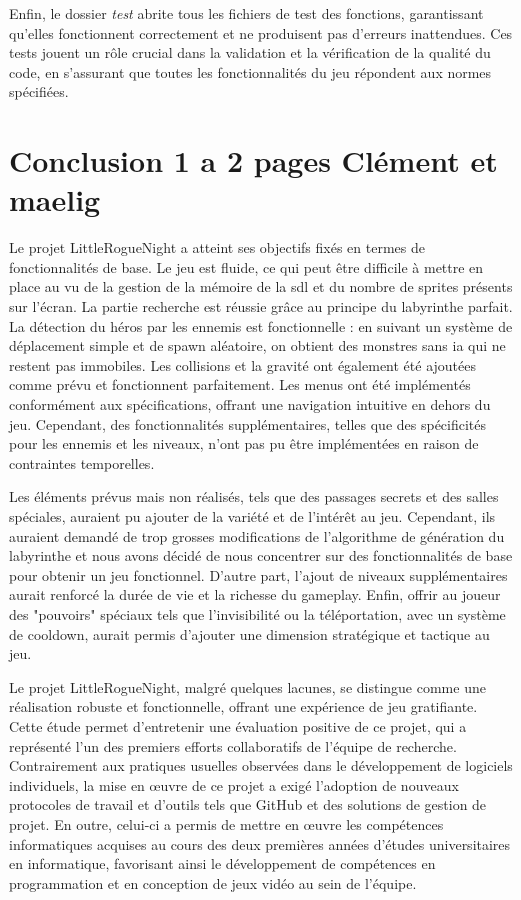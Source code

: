 \documentclass[10pt]{article}
\begin{document}
Enfin, le dossier \textit{test} abrite tous les fichiers de test des fonctions, garantissant qu'elles fonctionnent correctement et ne produisent pas d'erreurs inattendues. Ces tests jouent un rôle crucial dans la validation et la vérification de la qualité du code, en s'assurant que toutes les fonctionnalités du jeu répondent aux normes spécifiées.

   
\section{Conclusion 1 a 2 pages Clément et maelig}

Le projet LittleRogueNight a atteint ses objectifs fixés en termes de fonctionnalités de base. Le jeu est fluide, ce qui peut être difficile à mettre en place au vu de la gestion de la mémoire de la \gls{sdl} et du nombre de \gls{sprites} présents sur l'écran. La partie recherche est réussie grâce au principe du labyrinthe parfait. La détection du héros par les ennemis est fonctionnelle : en suivant un système de déplacement simple et de spawn aléatoire, on obtient des monstres sans \gls{ia} qui ne restent pas immobiles. Les collisions et la gravité ont également été ajoutées comme prévu et fonctionnent parfaitement. Les menus ont été implémentés conformément aux spécifications, offrant une navigation intuitive en dehors du jeu. Cependant, des fonctionnalités supplémentaires, telles que des spécificités pour les ennemis et les niveaux, n'ont pas pu être implémentées en raison de contraintes temporelles.

Les éléments prévus mais non réalisés, tels que des passages secrets et des salles spéciales, auraient pu ajouter de la variété et de l'intérêt au jeu. Cependant, ils auraient demandé de trop grosses modifications de l'algorithme de génération du labyrinthe et nous avons décidé de nous concentrer sur des fonctionnalités de base pour obtenir un jeu fonctionnel. D'autre part, l'ajout de niveaux supplémentaires aurait renforcé la durée de vie et la richesse du \gls{gameplay}. Enfin, offrir au joueur des "pouvoirs" spéciaux tels que l'invisibilité ou la téléportation, avec un système de cooldown, aurait permis d'ajouter une dimension stratégique et tactique au jeu.

Le projet LittleRogueNight, malgré quelques lacunes, se distingue comme une réalisation robuste et fonctionnelle, offrant une expérience de jeu gratifiante. Cette étude permet d'entretenir une évaluation positive de ce projet, qui a représenté l'un des premiers efforts collaboratifs de l'équipe de recherche. Contrairement aux pratiques usuelles observées dans le développement de logiciels individuels, la mise en œuvre de ce projet a exigé l'adoption de nouveaux protocoles de travail et d'outils tels que GitHub et des solutions de gestion de projet. En outre, celui-ci a permis de mettre en œuvre les compétences informatiques acquises au cours des deux premières années d'études universitaires en informatique, favorisant ainsi le développement de compétences en programmation et en conception de jeux vidéo au sein de l'équipe.
\end{document}
